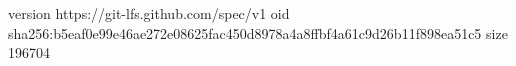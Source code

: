version https://git-lfs.github.com/spec/v1
oid sha256:b5eaf0e99e46ae272e08625fac450d8978a4a8ffbf4a61c9d26b11f898ea51c5
size 196704
